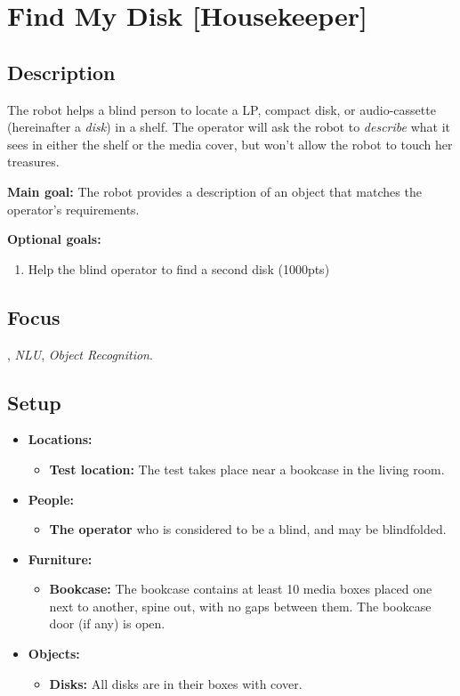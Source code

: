 \section{Find My Disk [Housekeeper]}
\label{test:find-my-disk}

\subsection*{Description}
   The robot helps a blind person to locate a LP, compact disk, or audio-cassette (hereinafter a \textit{disk}) in a shelf. The operator will ask the robot to \emph{describe} what it sees in either the shelf or the media cover, but won't allow the robot to touch her treasures.

\textbf{Main goal:}
   The robot provides a description of an object that matches the operator's requirements.

\textbf{Optional goals:}
\begin{enumerate}[nosep]
	\item Help the blind operator to find a second disk (1000pts)
\end{enumerate}

\subsection*{Focus}
\HRI{}, \textit{NLU}, \textit{Object Recognition}.


\subsection*{Setup}
\begin{itemize}[nosep]
	\item \textbf{Locations:}
		\begin{itemize}
			\item \textbf{Test location:} The test takes place near a bookcase in the living room.
		\end{itemize}
	\item \textbf{People:}
		\begin{itemize}
			\item \textbf{The operator} who is considered to be a blind, and may be blindfolded.
		\end{itemize}
	\item \textbf{Furniture:}
		\begin{itemize}
			\item \textbf{Bookcase:} The bookcase contains at least 10 media boxes placed one next to another, spine out, with no gaps between them. The bookcase door (if any) is open.
		\end{itemize}
	\item \textbf{Objects:}
		\begin{itemize}
			\item \textbf{Disks:} All disks are in their boxes with cover.
		\end{itemize}
\end{itemize}

